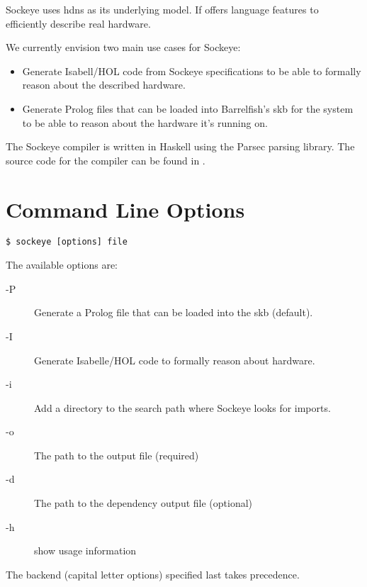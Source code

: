 \documentclass[a4paper,11pt,twoside]{report}
\begin{document}
{{{Sockeye uses \glspl{hdn} as its underlying model.
If offers language features to efficiently describe real hardware.

We currently envision two main use cases for Sockeye:
\begin{itemize}
  \item Generate Isabell/HOL code from Sockeye specifications to be able to formally reason about the described hardware.
  \item Generate Prolog files that can be loaded into Barrelfish's \gls{skb} for the system to be able to reason about the hardware it's running on.
\end{itemize}

The Sockeye compiler is written in Haskell using the Parsec parsing library.
The source code for the compiler can be found in .


\clearpage
\section{Command Line Options}

\begin{verbatim}
$ sockeye [options] file
\end{verbatim}


The available options are:
\begin{description}
\item[-P] Generate a Prolog file that can be loaded into the \gls{skb} (default).
\item[-I] Generate Isabelle/HOL code to formally reason about hardware.
\item[-i] Add a directory to the search path where Sockeye looks for imports.
\item[-o]  The path to the output file (required)
\item[-d]  The path to the dependency output file (optional)
\item[-h] show usage information
\end{description}

The backend (capital letter options) specified last takes precedence.

}}}
\end{document}
